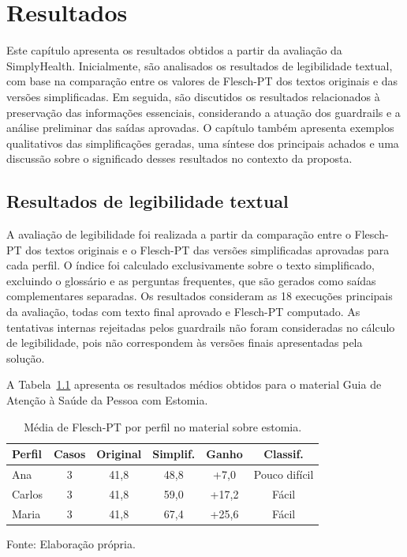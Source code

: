 \chapter{Resultados}
\label{cap:resultados}

Este capítulo apresenta os resultados obtidos a partir da avaliação da SimplyHealth. Inicialmente, são analisados os resultados de legibilidade textual, com base na comparação entre os valores de Flesch-PT dos textos originais e das versões simplificadas. Em seguida, são discutidos os resultados relacionados à preservação das informações essenciais, considerando a atuação dos guardrails e a análise preliminar das saídas aprovadas. O capítulo também apresenta exemplos qualitativos das simplificações geradas, uma síntese dos principais achados e uma discussão sobre o significado desses resultados no contexto da proposta.

\section{Resultados de legibilidade textual}
\label{sec:resultados-legibilidade-textual}

A avaliação de legibilidade foi realizada a partir da comparação entre o Flesch-PT dos textos originais e o Flesch-PT das versões simplificadas aprovadas para cada perfil. O índice foi calculado exclusivamente sobre o texto simplificado, excluindo o glossário e as perguntas frequentes, que são gerados como saídas complementares separadas. Os resultados consideram as 18 execuções principais da avaliação, todas com texto final aprovado e Flesch-PT computado. As tentativas internas rejeitadas pelos guardrails não foram consideradas no cálculo de legibilidade, pois não correspondem às versões finais apresentadas pela solução.

A Tabela~\ref{tab:flesch-estomia} apresenta os resultados médios obtidos para o material Guia de Atenção à Saúde da Pessoa com Estomia.

\begin{table}[htbp]
  \centering
  \caption{Média de Flesch-PT por perfil no material sobre estomia.}
  \label{tab:flesch-estomia}
  \small
  \renewcommand{\arraystretch}{1.15}
  \begin{tabular}{lccccc}
    \hline
    \textbf{Perfil} & \textbf{Casos} & \textbf{Original} & \textbf{Simplif.} & \textbf{Ganho} & \textbf{Classif.} \\
    \hline
    Ana    & 3 & 41,8 & 48,8 & +7,0  & Pouco difícil \\
    Carlos & 3 & 41,8 & 59,0 & +17,2 & Fácil \\
    Maria  & 3 & 41,8 & 67,4 & +25,6 & Fácil \\
    \hline
  \end{tabular}

  {\footnotesize Fonte: Elaboração própria.}
\end{table}

